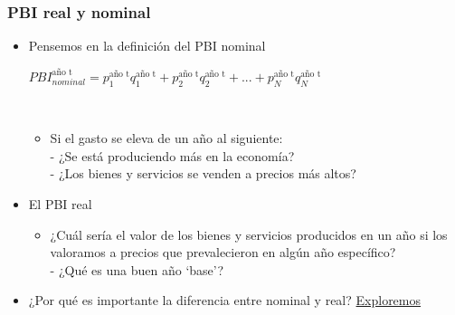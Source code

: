 \documentclass{beamer}
\begin{document}
\begin{frame}
\frametitle{PBI real y nominal}
\begin{itemize}
        \item Pensemos en la definición del PBI nominal
        \\ \vspace{1mm}
        \begin{center} \small{
            $PBI_{nominal}^{\text{año t}}=p_{1}^{\text{año t}}q_{1}^{\text{año t}}+p_{2}^{\text{año t}}q_{2}^{\text{año t}}+...+p_{N}^{\text{año t}}q_{N}^{\text{año t}}$}
        \end{center}
        \\ \vspace{1mm}
        \begin{itemize}
            \item Si el gasto se eleva de un año al siguiente: \\
            - ¿Se está produciendo más en la economía? \\
            - ¿Los bienes y servicios se venden a precios más altos?
            \end{itemize} \vspace{1mm}
        \item El PBI real
        \begin{itemize}
            \item ¿Cuál sería el valor de los bienes y servicios producidos en un año si los valoramos a precios que prevalecieron en algún año específico? \\
            - ¿Qué es una buen año ‘base’?
            \end{itemize} \vspace{1mm}
        \item ¿Por qué es importante la diferencia entre nominal y real? \href{https://www.gapminder.org/tools/#$model$markers$line$data$filter$dimensions$country$country$/$in@=arg;;;;;;&encoding$y$data$concept=inflation_annual_percent&space@=country&=time;;&scale$type:null&domain:null&zoomed:null;;&frame$value=2013;;;;;&chart-type=linechart&url=v1}{Exploremos}
\end{itemize}
\end{frame}
\end{document}
